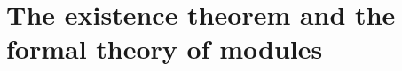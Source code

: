 \chapter{The existence theorem and the formal theory of modules}\label{fga3.ii}



\newpage


\newpage


\newpage
